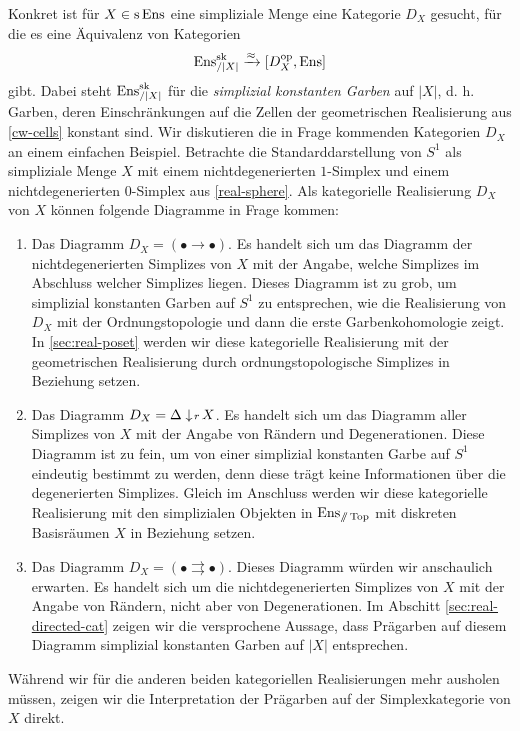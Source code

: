 Konkret ist für $X \in \operatorname{s}\operatorname{Ens}$ eine simpliziale Menge eine Kategorie
$D_X$ gesucht, für die es eine Äquivalenz von Kategorien
\[ \operatorname{Ens}_{/|X|}^{\operatorname{sk}} \xrightarrow{\approx} {[D_X^\mathrm{op}, \operatorname{Ens}]} \]
gibt. Dabei steht $\operatorname{Ens}_{/|X|}^{\operatorname{sk}}$ für die \emph{simplizial
  konstanten Garben} auf $|X|$, d. h. Garben, deren Einschränkungen
auf die Zellen der geometrischen Realisierung aus \ref{cw-cells}
konstant sind. Wir diskutieren die in Frage kommenden Kategorien $D_X$
an einem einfachen Beispiel. Betrachte die Standarddarstellung von
$S^1$ als simpliziale Menge $X$ mit einem nichtdegenerierten
$1$-Simplex und einem nichtdegenerierten $0$-Simplex aus
\ref{real-sphere}. Als kategorielle Realisierung $D_X$ von $X$ können
folgende Diagramme in Frage kommen:
\begin{enumerate}
\item Das Diagramm $D_X = (\bullet \to \bullet)$. Es handelt sich um
  das Diagramm der nichtdegenerierten Simplizes von $X$ mit der
  Angabe, welche Simplizes im Abschluss welcher Simplizes
  liegen. Dieses Diagramm ist zu grob, um simplizial konstanten Garben
  auf $S^1$ zu entsprechen, wie die Realisierung von $D_X$ mit der
  Ordnungstopologie und dann die erste Garbenkohomologie zeigt. In
  \autoref{sec:real-poset} werden wir diese kategorielle Realisierung
  mit der geometrischen Realisierung durch ordnungstopologische
  Simplizes in Beziehung setzen.
\item Das Diagramm $D_X = \Delta \downarrow \! {\scriptstyle r} \, X$. Es handelt sich um
  das Diagramm aller Simplizes von $X$ mit der Angabe von Rändern und
  Degenerationen. Diese Diagramm ist zu fein, um von einer simplizial
  konstanten Garbe auf $S^1$ eindeutig bestimmt zu werden, denn diese
  trägt keine Informationen über die degenerierten Simplizes. Gleich
  im Anschluss werden wir diese kategorielle Realisierung mit den
  simplizialen Objekten in $\operatorname{Ens}_{\mathbin{/\mkern-6mu/} \operatorname{Top}}$ mit diskreten Basisräumen $X$
  in Beziehung setzen.
\item Das Diagramm $D_X = (\bullet \rightrightarrows \bullet)$. Dieses
  Diagramm würden wir anschaulich erwarten. Es handelt sich um die
  nichtdegenerierten Simplizes von $X$ mit der Angabe von Rändern,
  nicht aber von Degenerationen. Im Abschitt
  \ref{sec:real-directed-cat} zeigen wir die versprochene Aussage,
  dass Prägarben auf diesem Diagramm simplizial konstanten Garben auf
  $|X|$ entsprechen.
\end{enumerate}

Während wir für die anderen beiden kategoriellen Realisierungen mehr
ausholen müssen, zeigen wir die Interpretation der Prägarben auf der
Simplexkategorie von $X$ direkt.

